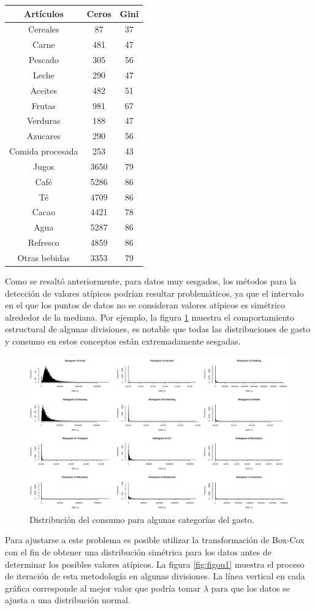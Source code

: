 \documentclass[
  12pt,
  spanish,
]{book}
\begin{document}
\begin{longtable}[]{@{}ccc@{}}
\toprule
Artículos & Ceros & Gini \\
\midrule
\endhead
Cereales & 87 & 37 \\
Carne & 481 & 47 \\
Pescado & 305 & 56 \\
Leche & 290 & 47 \\
Aceites & 482 & 51 \\
Frutas & 981 & 67 \\
Verduras & 188 & 47 \\
Azucares & 290 & 56 \\
Comida procesada & 253 & 43 \\
Jugos & 3650 & 79 \\
Café & 5286 & 86 \\
Té & 4709 & 86 \\
Cacao & 4421 & 78 \\
Agua & 5287 & 86 \\
Refresco & 4859 & 86 \\
Otras bebidas & 3353 & 79 \\
\bottomrule
\end{longtable}

Como se resaltó anteriormente, para datos muy sesgados, los métodos para la detección de valores atípicos podrían resultar problemáticos, ya que el intervalo en el que los puntos de datos no se consideran valores atípicos es simétrico alrededor de la mediana. Por ejemplo, la figura \ref{fig:figou2} muestra el comportamiento estructural de algunas divisiones, es notable que todas las distribuciones de gasto y consumo en estos conceptos están extremadamente sesgadas.

\begin{figure}
\includegraphics[width=0.5\linewidth]{Pics/ou2} \caption{Distribución del consumo para algunas categorías del gasto.}\label{fig:figou2}
\end{figure}

Para ajustarse a este problema es posible utilizar la transformación de Box-Cox con el fin de obtener una distribución simétrica para los datos antes de determinar los posibles valores atípicos. La figura \ref{fig:figou1} muestra el proceso de iteración de esta metodología en algunas divisiones. La línea vertical en cada gráfica corresponde al mejor valor que podría tomar \(\lambda\) para que los datos se ajusta a una distribución normal.
\end{document}
